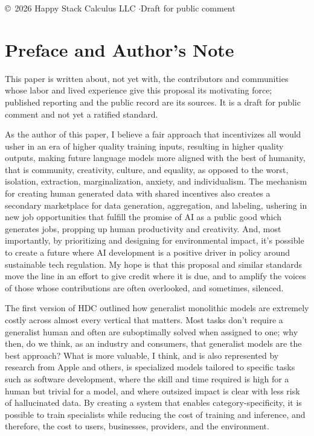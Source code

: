 \documentclass[10pt,a4paper,twocolumn]{article}
\begin{document}
\vfill
\begin{center}
{\scriptsize\copyright\ 2026 Happy Stack Calculus LLC \quad$\cdot$\quad Draft for public comment\par}
\end{center}
\clearpage

{\small\tableofcontents}

\newpage
\section*{Preface and Author's Note}

This paper is written about, not yet with, the contributors and communities whose labor and lived experience give this proposal its motivating force; published reporting and the public record are its sources. It is a draft for public comment and not yet a ratified standard.

As the author of this paper, I believe a fair approach that incentivizes all would usher in an era of higher quality training inputs, resulting in higher quality outputs, making future language models more aligned with the best of humanity, that is community, creativity, culture, and equality, as opposed to the worst, isolation, extraction, marginalization, anxiety, and individualism. The mechanism for creating human generated data with shared incentives also creates a secondary marketplace for data generation, aggregation, and labeling, ushering in new job opportunities that fulfill the promise of AI as a public good which generates jobs, propping up human productivity and creativity. And, most importantly, by prioritizing and designing for environmental impact, it's possible to create a future where AI development is a positive driver in policy around sustainable tech regulation. My hope is that this proposal and similar standards move the line in an effort to give credit where it is due, and to amplify the voices of those whose contributions are often overlooked, and sometimes, silenced.

The first version of HDC outlined how generalist monolithic models are extremely costly across almost every vertical that matters. Most tasks don't require a generalist human and often are suboptimally solved when assigned to one; why then, do we think, as an industry and consumers, that generalist models are the best approach? What is more valuable, I think, and is also represented by research from Apple and others, is specialized models tailored to specific tasks such as software development, where the skill and time required is high for a human but trivial for a model, and where outsized impact is clear with less risk of hallucinated data. By creating a system that enables category-specificity, it is possible to train specialists while reducing the cost of training and inference, and therefore, the cost to users, businesses, providers, and the environment.
\end{document}
